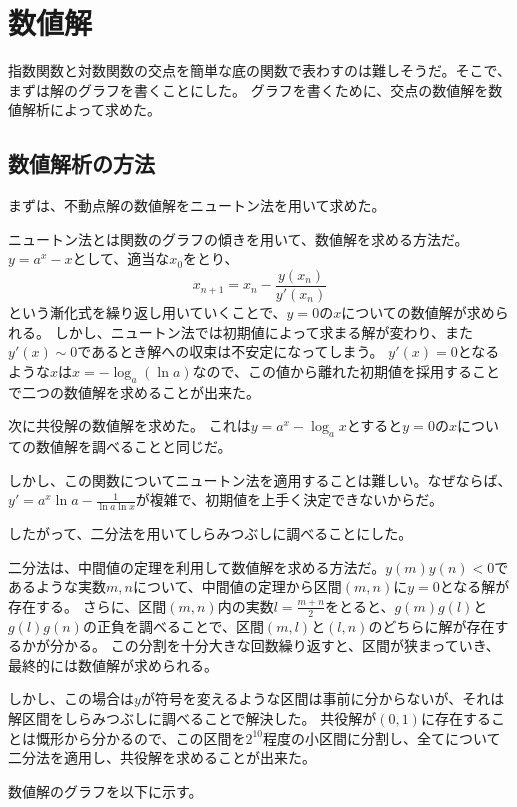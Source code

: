 \section{数値解}
	指数関数と対数関数の交点を簡単な底の関数で表わすのは難しそうだ。そこで、まずは解のグラフを書くことにした。
	グラフを書くために、交点の数値解を数値解析によって求めた。

\subsection{数値解析の方法}
	まずは、不動点解の数値解をニュートン法を用いて求めた。

	ニュートン法とは関数のグラフの傾きを用いて、数値解を求める方法だ。$y=a^x-x$として、適当な$x_0$をとり、
	\[
		x_{n+1} = x_n - \frac{y(x_n)}{y'(x_n)}
	\]
	という漸化式を繰り返し用いていくことで、$y=0$の$x$についての数値解が求められる。
	しかし、ニュートン法では初期値によって求まる解が変わり、また$y'(x) \sim 0$であるとき解への収束は不安定になってしまう。
	$y'(x) = 0$となるような$x$は$x = -\log_{a} \left(\ln{a}\right)$なので、この値から離れた初期値を採用することで二つの数値解を求めることが出来た。

	次に共役解の数値解を求めた。
	これは$y = a^{x} - \log_{a} x$とすると$y=0$の$x$についての数値解を調べることと同じだ。

	しかし、この関数についてニュートン法を適用することは難しい。なぜならば、$y' = a^{x}\ln{a} - \frac{1}{\ln{a}\ln{x}}$が複雑で、初期値を上手く決定できないからだ。

	したがって、二分法を用いてしらみつぶしに調べることにした。

	二分法は、中間値の定理を利用して数値解を求める方法だ。$y(m)y(n) < 0$であるような実数$m,n$について、中間値の定理から区間$(m,n)$に$y = 0$となる解が存在する。
	さらに、区間$(m,n)$内の実数$l = \frac{m+n}{2}$をとると、$g(m)g(l)$と$g(l)g(n)$の正負を調べることで、区間$(m,l)$と$(l,n)$のどちらに解が存在するかが分かる。
	この分割を十分大きな回数繰り返すと、区間が狭まっていき、最終的には数値解が求められる。

	しかし、この場合は$y$が符号を変えるような区間は事前に分からないが、それは解区間をしらみつぶしに調べることで解決した。
	共役解が$(0,1)$に存在することは慨形から分かるので、この区間を$2^{10}$程度の小区間に分割し、全てについて二分法を適用し、共役解を求めることが出来た。

	数値解のグラフを以下に示す。

